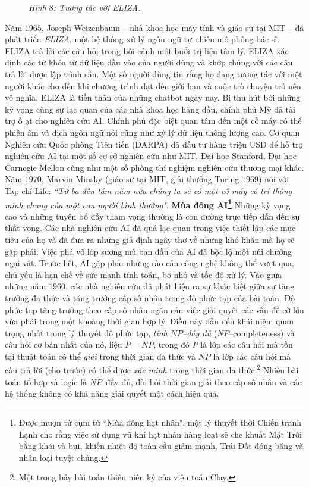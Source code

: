 \begin{multicols}{2}
\begin{figure}[H]
		\caption{\small\textit{\color{cackithi}Hình $8$: Tương tác với ELIZA.}}
		\vspace*{-10pt}
	\end{figure}
	Năm $1965$, Joseph Weizenbaum -- nhà khoa học máy tính và giáo sư tại MIT -- đã phát triển \textit{ELIZA}, một hệ thống xử lý ngôn ngữ tự nhiên mô phỏng bác sĩ. ELIZA trả lời các câu hỏi trong bối cảnh một buổi trị liệu tâm lý. ELIZA xác định các từ khóa từ dữ liệu đầu vào của người dùng và khớp chúng với các câu trả lời được lập trình sẵn. Một số người dùng tin rằng họ đang tương tác với một người khác cho đến khi chương trình đạt đến giới hạn và cuộc trò chuyện trở nên vô nghĩa. ELIZA là tiền thân của những chatbot ngày nay.
	\vskip 0.1cm
	Bị thu hút bởi những kỳ vọng cùng sự lạc quan của các nhà khoa học hàng đầu, chính phủ Mỹ đã tài trợ ồ ạt cho nghiên cứu AI. Chính phủ đặc biệt quan tâm đến một cỗ máy có thể phiên âm và dịch ngôn ngữ nói cũng như xỷ lý dữ liệu thông lượng cao. Cơ quan Nghiên cứu Quốc phòng Tiên tiến (DARPA) đã đầu tư hàng triệu USD để hỗ trợ nghiên cứu AI tại một số cơ sở nghiên cứu như MIT, Đại học Stanford, Đại học Carnegie Mellon cũng như một số phòng thí nghiệm nghiên cứu thương mại khác. Năm $1970$, Marvin Minsky (giáo sư tại MIT, giải thưởng Turing $1969$) nói với Tạp chí Life: \textit{``Từ ba đến tám năm nữa chúng ta sẽ có một cỗ máy có trí thông minh chung của một con người bình thường"}. 
	\vskip 0.1cm
	\textbf{\color{cackithi}Mùa đông AI\footnote{\color{cackithi}Được mượn từ cụm từ ``Mùa đông hạt nhân", một lý thuyết thời Chiến tranh Lạnh cho rằng việc sử dụng vũ khí hạt nhân hàng loạt sẽ che khuất Mặt Trời bằng khói và bụi, khiến nhiệt độ toàn cầu giảm mạnh, Trái Đất đóng băng và nhân loại tuyệt chủng.}}
	\vskip 0.1cm
	Những kỳ vọng cao và những tuyên bố đầy tham vọng thường là con đường trực tiếp dẫn đến sự thất vọng. Các nhà nghiên cứu AI đã quá lạc quan trong việc thiết lập các mục tiêu của họ và đã đưa ra những giả định ngây thơ về những khó khăn mà họ sẽ gặp phải. Việc phá vỡ lớp sương mù ban đầu của AI đã bộc lộ một núi chướng ngại vật. 
	\vskip 0.1cm
	Trước hết, AI gặp phải những rào cản công nghệ không thể vượt qua, chủ yếu là hạn chế về sức mạnh tính toán, bộ nhớ và tốc độ xử lý. Vào giữa những năm $1960$, các nhà nghiên cứu đã phát hiện ra sự khác biệt giữa sự tăng trưởng đa thức và tăng trưởng cấp số nhân trong độ phức tạp của bài toán. Độ phức tạp tăng trưởng theo cấp số nhân ngăn cản việc giải quyết các vấn đề cỡ lớn vừa phải trong một khoảng thời gian hợp lý. Điều này dẫn đến khái niệm quan trọng nhất trong lý thuyết độ phức tạp, \textit{tính  $NP$--đầy đủ} ($NP$--completeness) và câu hỏi cơ bản nhất của nó, liệu $P = NP$, trong đó $P$ là lớp các câu hỏi mà tồn tại thuật toán có thể \textit{giải} trong thời gian đa thức và $NP$ là lớp các câu hỏi mà câu trả lời (cho trước) có thể được \textit{xác minh} trong thời gian đa thức.\footnote{\color{cackithi}Một trong bảy bài toán thiên niên kỷ của viện toán Clay.} Nhiều bài toán tổ hợp và logic là $NP$--đầy đủ, đòi hỏi thời gian giải theo cấp số nhân và các hệ thống không có khả năng giải quyết một cách hiệu quả.

\end{multicols}
